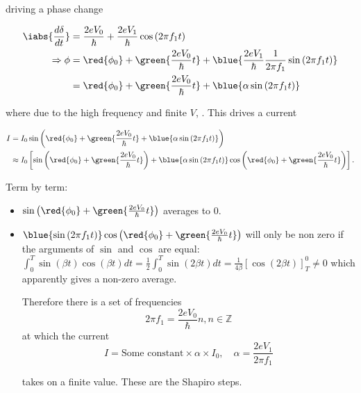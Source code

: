\noindent driving a phase change

\begin{equation}
  \begin{aligned}
    \iabs{\frac{d\delta}{dt}} & = \frac{2eV_0}{\hbar} +
    \frac{2eV_{1}}{\hbar}\cos\left(  2\pi f_1  t \right)  \\
    \Rightarrow \phi & = \red{\phi_0} + \green{\frac{2eV_0}{\hbar}t} + \blue{\frac{2eV_{1}}{\hbar}\frac{1}{2\pi
        f_{1}}\sin\left( 2\pi f_1 t \right)} \\
    & = \red{\phi_0} + \green{\frac{2eV_0}{\hbar}t} +
    \blue{\alpha\sin\left( 2\pi f_1 t \right)} \\
  \end{aligned}
\end{equation}

\noindent where due to the high frequency and finite $V$, .  This drives
a current

\begin{equation}
  \begin{aligned}
    I & = I_0\sin\left(\red{\phi_0} + \green{\frac{2eV_0}{\hbar}t} +
      \blue{\alpha\sin\left( 2\pi f_1 t \right)} \right) \\
    &  \approx  I_0 \left[  \sin\left(\red{\phi_0}  +  \green{\frac{2eV_0}{\hbar}t}\right)  +  \blue{\alpha\sin\left( 2\pi  f_1  t
        \right)}\cos \left(\red{\phi_0} + \green{\frac{2eV_0}{\hbar}t} \right) \right].
  \end{aligned}
\end{equation}

\noindent Term by term:

\begin{itemize}
\item $\sin\left(\red{\phi_0} + \green{\frac{2eV_0}{\hbar}t}\right)$ averages to 0.
\item $\blue{\sin\left( 2\pi f_1 t \right)}\cos \left(\red{\phi_0}  + \green{\frac{2eV_0}{\hbar}t} \right)$ will only be non
  zero        if        the         arguments        of        $\sin$        and         $\cos$        are        equal:
  $\int_0^T\sin(\beta  t)\cos(\beta  t)dt  =  \frac{1}{2}\int_0^{T}\sin(2\beta  t)dt  =  \frac{1}{4\beta}\left[  \cos(2\beta  t)
  \right]_T^0 \ne 0 $ which apparently gives a non-zero average.

  \begin{framed}\noindent
    Therefore there is a set of frequencies
    \begin{equation}
      2\pi f_{1} = \frac{2eV_{0}}{\hbar}n, n \in \mathbb{Z}
    \end{equation}
    at which the current
    \begin{equation}
      I = \text{Some constant} \times \alpha \times I_0, \quad \alpha = \frac{2eV_{1}}{2\pi  f_1}
    \end{equation}

    \noindent takes on a finite value. These are the Shapiro steps.
  \end{framed}
\end{itemize}

